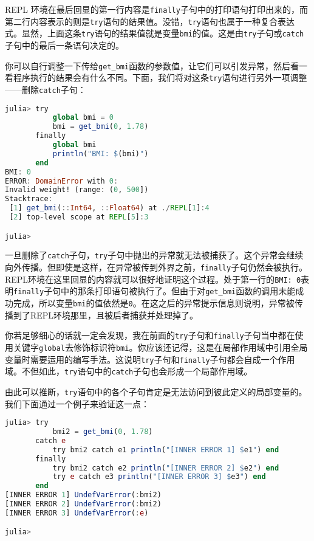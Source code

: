 REPL 环境在最后回显的第一行内容是\verb`finally`子句中的打印语句打印出来的，而第二行内容表示的则是\verb`try`语句的结果值。没错，\verb`try`语句也属于一种复合表达式。显然，上面这条\verb`try`语句的结果值就是变量\verb`bmi`的值。这是由\verb`try`子句或\verb`catch`子句中的最后一条语句决定的。

你可以自行调整一下传给\verb`get_bmi`函数的参数值，让它们可以引发异常，然后看一看程序执行的结果会有什么不同。下面，我们将对这条\verb`try`语句进行另外一项调整——删除\verb`catch`子句：

\begin{lstlisting}[language=julia]
julia> try 
           global bmi = 0
           bmi = get_bmi(0, 1.78)
       finally
           global bmi
           println("BMI: $(bmi)")
       end
BMI: 0
ERROR: DomainError with 0:
Invalid weight! (range: (0, 500])
Stacktrace:
 [1] get_bmi(::Int64, ::Float64) at ./REPL[1]:4
 [2] top-level scope at REPL[5]:3

julia> 
\end{lstlisting}

一旦删除了\verb`catch`子句，\verb`try`子句中抛出的异常就无法被捕获了。这个异常会继续向外传播。但即使是这样，在异常被传到外界之前，\verb`finally`子句仍然会被执行。REPL环境在这里回显的内容就可以很好地证明这个过程。处于第一行的\verb`BMI: 0`表明\verb`finally`子句中的那条打印语句被执行了。但由于对\verb`get_bmi`函数的调用未能成功完成，所以变量\verb`bmi`的值依然是\verb`0`。在这之后的异常提示信息则说明，异常被传播到了REPL环境那里，且被后者捕获并处理掉了。

你若足够细心的话就一定会发现，我在前面的\verb`try`子句和\verb`finally`子句当中都在使用关键字\verb`global`去修饰标识符\verb`bmi`。你应该还记得，这是在局部作用域中引用全局变量时需要运用的编写手法。这说明\verb`try`子句和\verb`finally`子句都会自成一个作用域。不但如此，\verb`try`语句中的\verb`catch`子句也会形成一个局部作用域。

由此可以推断，\verb`try`语句中的各个子句肯定是无法访问到彼此定义的局部变量的。我们下面通过一个例子来验证这一点：

\begin{lstlisting}[language=julia]
julia> try 
           bmi2 = get_bmi(0, 1.78)
       catch e
           try bmi2 catch e1 println("[INNER ERROR 1] $e1") end
       finally
           try bmi2 catch e2 println("[INNER ERROR 2] $e2") end
           try e catch e3 println("[INNER ERROR 3] $e3") end
       end
[INNER ERROR 1] UndefVarError(:bmi2)
[INNER ERROR 2] UndefVarError(:bmi2)
[INNER ERROR 3] UndefVarError(:e)

julia> 
\end{lstlisting}

